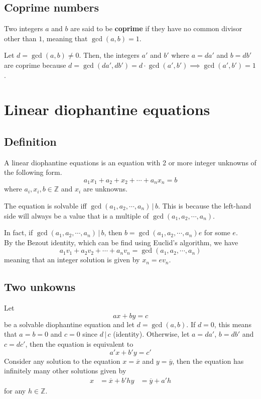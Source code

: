 \documentclass[preview]{standalone}
\newcommand{\divides}{\,|\,}
\begin{document}
\subsection{Coprime numbers}

Two integers \(a\) and \(b\) are said to be \textbf{coprime}
if they have no common divisor other than \(1\), meaning that \(\gcd(a,b)=1\).

Let \(d = \gcd(a, b) \neq 0\). Then, the integers \(a'\) and \(b'\) where \(a = da'\) and \(b = db'\)
are coprime because \(d = \gcd(da', db') = d\cdot \gcd(a', b') \implies \gcd(a', b') = 1\).


\pagebreak

\section{Linear diophantine equations}

\subsection{Definition}

A linear diophantine equations is an equation with 2 or more integer unknowns of the following form.
\[
    a_1x_1 + a_2+x_2 + \cdots + a_nx_n = b
\]
where \(a_i,x_i,b \in \mathbb{Z}\) and \(x_i\) are unknowns.

The equation is solvable iff \(\gcd(a_1,a_2,\cdots,a_n) \divides b\).
This is because the left-hand side will always be a value that is a multiple
of \(\gcd(a_1,a_2,\cdots,a_n)\).

In fact, if \(\gcd(a_1,a_2,\cdots,a_n) \divides b\),
then \(b = \gcd(a_1,a_2,\cdots,a_n)e\) for some \(e\). \\
By the Bezout identity, which can be find using Euclid's algorithm, we have
\[a_1v_1+a_2v_2+\cdots+a_nv_n=\gcd(a_1,a_2,\cdots,a_n)\]
meaning that an integer solution is given by \(x_n=ev_n\).

\subsection{Two unkowns}

Let \[ax+by=c\] be a solvable diophantine equation
and let \(d = \gcd(a,b)\).
If \(d=0\), this means that \(a=b=0\) and \(c=0\) since \(d \divides c\) (identity).
Otherwise, let \(a=da'\), \(b=db'\) and \(c=dc'\), then the equation is equivalent to
\[
    a'x + b'y = c'
\]
Consider any solution to the equation \(x=\overline{x}\) and \(y=\overline{y}\),
then the equation has infinitely many other solutions given by
\begin{align*}
    x &= \overline{x} + b'h
    y &= \overline{y} + a'h
\end{align*}
for any \(h \in \mathbb{Z}\).
\end{document}

